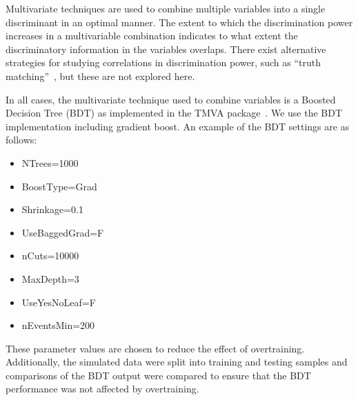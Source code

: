\noindent

Multivariate techniques are used to combine multiple variables into a
single discriminant in an optimal manner. The extent to which the discrimination power
increases in a multivariable combination indicates to what extent the
discriminatory information in the variables overlaps. There exist alternative
 strategies for studying correlations in discrimination power, such as 
 ``truth matching''~\cite{Larkoski:2014pca}, but these are not explored here.

In all cases, the multivariate technique used to combine variables is a Boosted Decision Tree (BDT) as implemented in the TMVA package~\cite{Hocker:2007ht}.
We use the BDT implementation including gradient boost.  
An example of the BDT settings are as follows: 
\begin{itemize}
\item NTrees=1000
\item BoostType=Grad
\item Shrinkage=0.1
\item UseBaggedGrad=F
\item nCuts=10000
\item MaxDepth=3
\item UseYesNoLeaf=F
\item nEventsMin=200
\end{itemize}
These parameter values are chosen to reduce the effect of overtraining.
Additionally, the simulated data were split into training and testing samples and comparisons of the BDT output were compared to ensure that the BDT performance was not affected by overtraining.  
